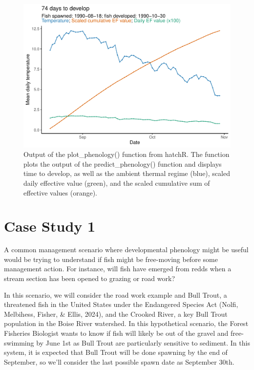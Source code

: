 \documentclass[10pt,a4paper,onecolumn]{article}
\begin{document}
\begin{figure}
\centering
\includegraphics{paper_files/figure-latex/unnamed-chunk-15-1.pdf}
\caption{Output of the plot\_phenology() function from hatchR. The
function plots the output of the predict\_phenology() function and
displays time to develop, as well as the ambient thermal regime (blue),
scaled daily effective value (green), and the scaled cumulative sum of
effective values (orange).}
\end{figure}

\section{Case Study 1}\label{case-study-1}

A common management scenario where developmental phenology might be
useful would be trying to understand if fish might be free-moving before
some management action. For instance, will fish have emerged from redds
when a stream section has been opened to grazing or road work?

In this scenario, we will consider the road work example and Bull Trout,
a threatened fish in the United States under the Endangered Species Act
(Nolfi, Melbihess, Fisher, \& Ellis, 2024), and the Crooked River, a key
Bull Trout population in the Boise River watershed. In this hypothetical
scenario, the Forest Fisheries Biologist wants to know if fish will
likely be out of the gravel and free-swimming by June 1st as Bull Trout
are particularly sensitive to sediment. In this system, it is expected
that Bull Trout will be done spawning by the end of September, so we'll
consider the last possible spawn date as September 30th.
\end{document}
